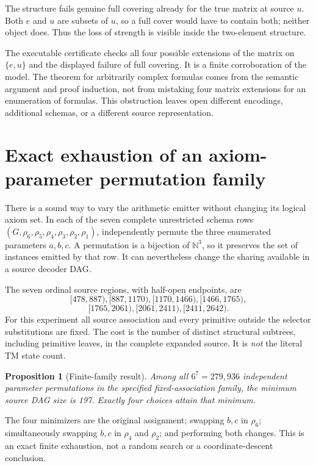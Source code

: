 \documentclass[11pt,a4paper]{article}
\newtheorem{proposition}[theorem]{Proposition}
\begin{document}
The structure fails genuine full covering already for the true matrix at
source $u$. Both $e$ and $u$ are subsets of $u$, so a full cover would have
to contain both; neither object does. Thus the loss of strength is visible
inside the two-element structure.

The executable certificate checks all four possible extensions of the
matrix on $\{e,u\}$ and the displayed failure of full covering. It is a
finite corroboration of the model. The theorem for arbitrarily complex
formulas comes from the semantic argument and proof induction, not from
mistaking four matrix extensions for an enumeration of formulas. This
obstruction leaves open different encodings, additional schemas, or a
different source representation.

\section{Exact exhaustion of an axiom-parameter permutation family}\label{sec:permutations}

There is a sound way to vary the arithmetic emitter without changing its
logical axiom set. In each of the seven complete unrestricted schema rows
$(G,\rho_6,\rho_5,\rho_4,\rho_3,\rho_2,\rho_1)$, independently permute
the three enumerated parameters $a,b,c$. A permutation is a bijection of
$\mathbb N^3$, so it preserves the set of instances emitted by that row.
It can nevertheless change the sharing available in a source decoder DAG.

The seven ordinal source regions, with half-open endpoints, are
\[
[478,887),[887,1170),[1170,1466),[1466,1765),
\]
\[
[1765,2061),[2061,2411),[2411,2642).
\]
For this experiment all source association and every primitive outside the
selector substitutions are fixed. The cost is the number of distinct
structural subtrees, including primitive leaves, in the complete expanded
source. It is \emph{not} the literal TM state count.

\begin{proposition}[Finite-family result]\label{prop:permutations}
Among all $6^7=279{,}936$ independent parameter permutations in the
specified fixed-association family, the minimum source DAG size is 197.
Exactly four choices attain that minimum.
\end{proposition}

The four minimizers are the original assignment; swapping $b,c$ in
$\rho_6$; simultaneously swapping $b,c$ in $\rho_4$ and $\rho_2$; and
performing both changes. This is an exact finite exhaustion, not a random
search or a coordinate-descent conclusion.
\end{document}

